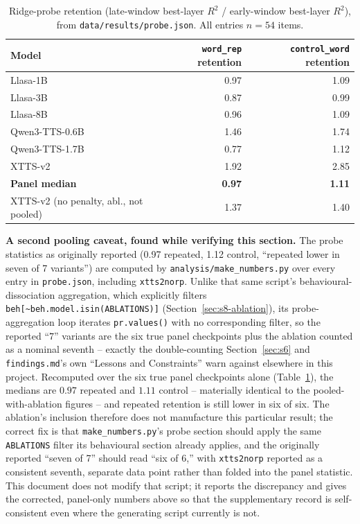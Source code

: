 \documentclass[11pt]{article}
\begin{document}
\begin{table}[h]
\centering
\caption{Ridge-probe retention (late-window best-layer $R^2$ / early-window
best-layer $R^2$), from \texttt{data/results/probe.json}. All entries $n{=}54$
items.}
\label{tab:probe}
\small
\begin{tabular}{@{}lrr@{}}
\toprule
Model & \texttt{word\_rep} retention & \texttt{control\_word} retention \\
\midrule
Llasa-1B & 0.97 & 1.09 \\
Llasa-3B & 0.87 & 0.99 \\
Llasa-8B & 0.96 & 1.09 \\
Qwen3-TTS-0.6B & 1.46 & 1.74 \\
Qwen3-TTS-1.7B & 0.77 & 1.12 \\
XTTS-v2 & 1.92 & 2.85 \\
\midrule
\textbf{Panel median} & \textbf{0.97} & \textbf{1.11} \\
XTTS-v2 (no penalty, abl., not pooled) & 1.37 & 1.40 \\
\bottomrule
\end{tabular}
\end{table}

\textbf{A second pooling caveat, found while verifying this section.} The
probe statistics as originally reported (0.97 repeated, 1.12 control,
``repeated lower in seven of 7 variants'') are
computed by \texttt{analysis/make\_numbers.py} over every entry in
\texttt{probe.json}, including \texttt{xtts2norp}. Unlike that same script's
behavioural-dissociation aggregation, which explicitly filters
\texttt{beh[\textasciitilde{}beh.model.isin(ABLATIONS)]}
(Section~\ref{sec:s8-ablation}), its probe-aggregation loop iterates
\texttt{pr.values()} with no corresponding filter, so the reported ``$7$''
variants are the six true panel checkpoints plus the ablation counted as a
nominal seventh -- exactly the double-counting Section~\ref{sec:s6} and
\texttt{findings.md}'s own ``Lessons and Constraints'' warn against elsewhere
in this project. Recomputed over the six true panel checkpoints alone
(Table~\ref{tab:probe}), the medians are $0.97$ repeated and $1.11$ control --
materially identical to the pooled-with-ablation figures -- and repeated
retention is still lower in six of six. The ablation's inclusion therefore
does not manufacture this particular result; the correct fix is that
\texttt{make\_numbers.py}'s probe section should apply the same
\texttt{ABLATIONS} filter its behavioural section already applies, and the
originally reported ``seven of 7'' should read ``six of 6,'' with \texttt{xtts2norp}
reported as a consistent seventh, separate data point rather than folded into
the panel statistic. This document does not modify that script; it reports
the discrepancy and gives the corrected, panel-only numbers above so that the
supplementary record is self-consistent even where the generating script
currently is not.
\end{document}
